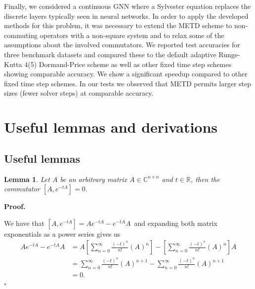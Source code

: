 \documentclass[12pt]{article}
\newtheorem{lem}{Lemma}
\newenvironment{pf}{\noindent\textbf{Proof.}}{\hfill$\square$}
\begin{document}
Finally, we considered a continuous GNN where a Sylvester equation replaces the discrete layers typically seen in neural networks. In order to apply the developed methods for this problem, it was necessary to extend the METD scheme to non-commuting operators with a non-square system and to relax some of the assumptions about the involved commutators. We reported test accuracies for three benchmark datasets and compared these to the default adaptive Runge-Kutta 4(5) Dormand-Price scheme as well as other fixed time step schemes showing comparable accuracy. We show a significant speedup compared to other fixed time step schemes. In our tests we observed that METD permits larger step sizes (fewer solver steps) at comparable accuracy.


\appendix
\section{Useful lemmas and derivations} 


\subsection{Useful lemmas}

\begin{lem}
\label{lma1}
Let $A$ be an arbitrary matrix $A \in \mathbb{C}^{n \times n}$ and $t \in \mathbb{R}$, then the commutator $[A,e^{-tA}] = 0$.
\end{lem}


\begin{pf}

 We have that $[A,e^{-tA}] = Ae^{-tA} - e^{-tA}A \,$ and expanding both matrix exponentials as a power series gives us 
\begin{align*}
     Ae^{-tA} - e^{-tA}A &= A \left[\sum_{n=0}^{\infty} \frac{(-t)^n}{n!}(A)^{n} \right] - \left[ \sum_{n=0}^{\infty} \frac{(-t)^n}{n!}(A)^{n}\right] A\\ 
     &= \sum_{n=0}^{\infty} \frac{(-t)^n}{n!}(A)^{n+1} - \sum_{n=0}^{\infty} \frac{(-t)^n}{n!}(A)^{n+1}\\
     &= 0.
\end{align*}
\end{pf}
\end{document}

